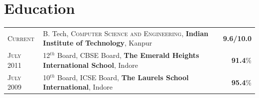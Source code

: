 \documentclass[a4paper]{article} %
\newcommand{\highlight}[2]{
    \begin{tabular}{p{2.4cm}|l}
        \textsc {\large #1} & #2
    \end{tabular}
}
\begin{document}
%
%


\section{Education}
\def\arraystretch{1.2}
\begin{tabular}{>{\raggedleft}p{1.5cm}p{15cm}r}

    \textsc{Current} & B. Tech, \textsc{Computer Science and Engineering},
    \textbf{Indian Institute of Technology}, Kanpur
    & \textbf{9.6/10.0}\\

    \textsc{July 2011} & 12$^{th}$ Board, \textsc{CBSE} Board,
    \textbf{The Emerald Heights International School}, Indore
    & \textbf{91.4}\% \\

    \textsc{July 2009} & 10$^{th}$ Board, \textsc{ICSE} Board,
    \textbf{The Laurels School International}, Indore
    & \textbf{95.4}\% \\

\end{tabular}
\def\arraystretch{1}

\end{document}
